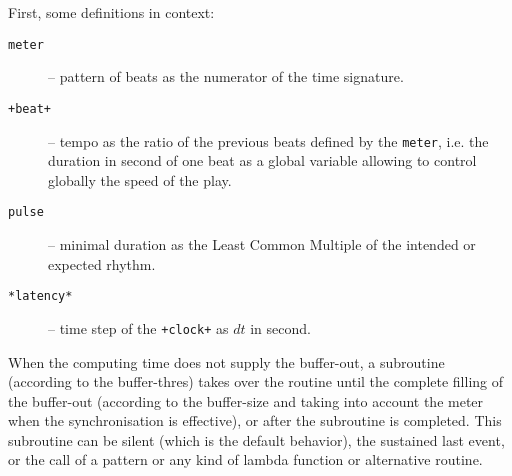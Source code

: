 \bigskip
\bigskip

{}

\bigskip

First, some definitions in context:
\begin{description}
\item[\texttt{meter}] -- pattern of beats as the numerator of the time signature.
\item[\texttt{+beat+}] -- tempo as the ratio of the previous beats defined by the \texttt{meter}, i.e. the duration in second of one beat as a global variable allowing to control globally the speed of the play.
\item[\texttt{pulse}] -- minimal duration as the Least Common Multiple of the intended or expected rhythm.
\item[\texttt{*latency*}] -- time step of the \texttt{+clock+} as $dt$ in second.
\end{description}
   
%   
%
%

\bigskip
\bigskip

{}

\bigskip

When the computing time does not supply the buffer-out, a subroutine (according to the buffer-thres) takes over the routine until the complete filling of the buffer-out (according to the buffer-size and  taking into account the meter when the synchronisation is effective), or after the subroutine is completed. This subroutine can be silent (which is the default behavior), the sustained last event, or the call of a pattern or any kind of lambda function or alternative routine.


